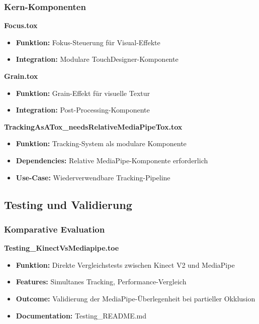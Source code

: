 \subsubsection{Kern-Komponenten}

\textbf{Focus.tox}
\begin{itemize}
    \item \textbf{Funktion:} Fokus-Steuerung für Visual-Effekte
    \item \textbf{Integration:} Modulare TouchDesigner-Komponente
\end{itemize}

\textbf{Grain.tox}
\begin{itemize}
    \item \textbf{Funktion:} Grain-Effekt für visuelle Textur
    \item \textbf{Integration:} Post-Processing-Komponente
\end{itemize}

\textbf{TrackingAsATox\_needsRelativeMediaPipeTox.tox}
\begin{itemize}
    \item \textbf{Funktion:} Tracking-System als modulare Komponente
    \item \textbf{Dependencies:} Relative MediaPipe-Komponente erforderlich
    \item \textbf{Use-Case:} Wiederverwendbare Tracking-Pipeline
\end{itemize}

\subsection{Testing und Validierung}

\subsubsection{Komparative Evaluation}

\textbf{Testing\_KinectVsMediapipe.toe}
\begin{itemize}
    \item \textbf{Funktion:} Direkte Vergleichstests zwischen Kinect V2 und MediaPipe
    \item \textbf{Features:} Simultanes Tracking, Performance-Vergleich
    \item \textbf{Outcome:} Validierung der MediaPipe-Überlegenheit bei partieller Okklusion
    \item \textbf{Documentation:} Testing\_README.md
\end{itemize}

